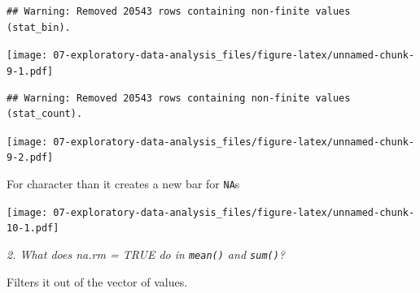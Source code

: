 \documentclass[]{book}
\newenvironment{Shaded}{\begin{snugshade}}{\end{snugshade}}
\newcommand{\DataTypeTok}[1]{\textcolor[rgb]{0.13,0.29,0.53}{#1}}
\newcommand{\DecValTok}[1]{\textcolor[rgb]{0.00,0.00,0.81}{#1}}
\newcommand{\FloatTok}[1]{\textcolor[rgb]{0.00,0.00,0.81}{#1}}
\newcommand{\KeywordTok}[1]{\textcolor[rgb]{0.13,0.29,0.53}{\textbf{#1}}}
\newcommand{\NormalTok}[1]{#1}
\newcommand{\OperatorTok}[1]{\textcolor[rgb]{0.81,0.36,0.00}{\textbf{#1}}}
\newcommand{\OtherTok}[1]{\textcolor[rgb]{0.56,0.35,0.01}{#1}}
\newcommand{\StringTok}[1]{\textcolor[rgb]{0.31,0.60,0.02}{#1}}
\theoremstyle{definition}
\theoremstyle{definition}
\theoremstyle{definition}
\theoremstyle{remark}
\begin{document}
\begin{verbatim}
## Warning: Removed 20543 rows containing non-finite values (stat_bin).
\end{verbatim}

\texttt{[image: 07-exploratory-data-analysis\_files/figure-latex/unnamed-chunk-9-1.pdf]}

\begin{Shaded}
\end{Shaded}

\begin{verbatim}
## Warning: Removed 20543 rows containing non-finite values (stat_count).
\end{verbatim}

\texttt{[image: 07-exploratory-data-analysis\_files/figure-latex/unnamed-chunk-9-2.pdf]}

For character than it creates a new bar for \texttt{NA}s

\begin{Shaded}
\end{Shaded}

\texttt{[image: 07-exploratory-data-analysis\_files/figure-latex/unnamed-chunk-10-1.pdf]}

\emph{2. What does na.rm = TRUE do in \texttt{mean()} and
\texttt{sum()}?}

Filters it out of the vector of values.
\end{document}
